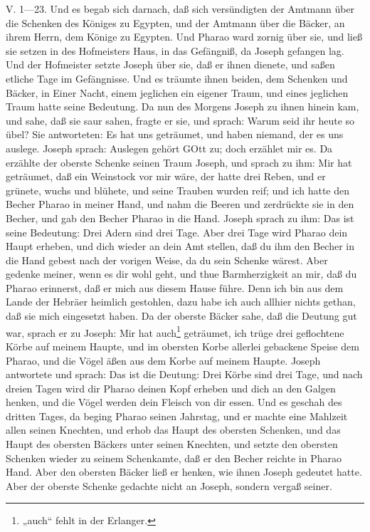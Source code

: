\begin{schriftzitat}
V. 1—23. Und es begab sich darnach, daß sich versündigten der Amtmann über die Schenken des Königes zu Egypten, und der Amtmann über die Bäcker, an ihrem Herrn, dem Könige zu Egypten. Und Pharao ward zornig über sie, und ließ sie setzen in des Hofmeisters Haus, in das Gefängniß, da Joseph gefangen lag. Und der Hofmeister setzte Joseph über sie, daß er ihnen dienete, und saßen etliche Tage im Gefängnisse. Und es träumte ihnen beiden, dem Schenken und Bäcker, in Einer Nacht, einem jeglichen ein eigener Traum, und eines jeglichen Traum hatte seine Bedeutung. Da nun des Morgens Joseph zu ihnen hinein kam, und sahe, daß sie saur sahen, fragte er sie, und sprach: Warum seid ihr heute so übel? Sie antworteten: Es hat uns geträumet, und haben niemand, der es uns auslege. Joseph sprach: Auslegen gehört GOtt zu; doch erzählet mir es. Da erzählte der oberste Schenke seinen Traum Joseph, und sprach zu ihm: Mir hat geträumet, daß ein Weinstock vor mir wäre, der hatte drei Reben, und er grünete, wuchs und blühete, und seine Trauben wurden reif; und ich hatte den Becher Pharao in meiner Hand, und nahm die Beeren und zerdrückte sie in den Becher, und gab den Becher Pharao in die Hand. Joseph
sprach zu ihm: Das ist seine Bedeutung: Drei Adern sind drei Tage. Aber drei Tage wird Pharao dein Haupt erheben, und dich wieder an dein Amt stellen, daß du ihm den Becher in die Hand gebest nach der vorigen Weise, da du sein Schenke wärest. Aber gedenke meiner, wenn es dir wohl geht, und thue Barmherzigkeit an mir, daß du Pharao erinnerst, daß er mich aus diesem Hause führe. Denn ich bin aus dem Lande der Hebräer heimlich gestohlen, dazu habe ich auch allhier nichts gethan, daß sie mich eingesetzt haben. Da der oberste Bäcker sahe, daß die Deutung gut war, sprach er zu Joseph: Mir hat auch\footnote{„auch“ fehlt in der Erlanger.} geträumet, ich trüge drei geflochtene Körbe auf meinem Haupte, und im obersten Korbe allerlei gebackene Speise dem Pharao, und die Vögel äßen aus dem Korbe auf meinem Haupte. Joseph antwortete und sprach: Das ist die Deutung: Drei Körbe sind drei Tage, und nach dreien Tagen wird dir Pharao deinen Kopf erheben und dich an den Galgen henken, und die Vögel werden dein Fleisch von dir essen. Und es geschah des dritten Tages, da beging Pharao seinen Jahrstag, und er machte eine Mahlzeit allen seinen Knechten, und erhob das Haupt des obersten Schenken, und das Haupt des obersten Bäckers unter seinen Knechten, und setzte den obersten Schenken wieder zu seinem Schenkamte, daß er den Becher reichte in Pharao Hand. Aber den obersten Bäcker ließ er henken, wie ihnen Joseph gedeutet hatte. Aber der oberste Schenke gedachte nicht an Joseph, sondern vergaß seiner.
\end{schriftzitat}

